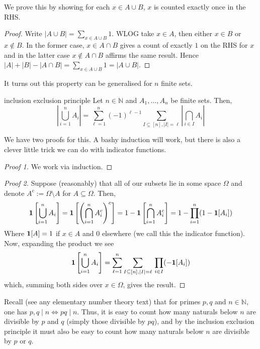 \documentclass{article}
\begin{document}
We prove this by showing for each $x \in A \cup B$, $x$ is counted exactly once in the RHS. 

\begin{proof}
    Write $|A \cup B| = \sum_{x \in A \cup B}1$.  WLOG take $x \in A$, then either $x \in B$ or $x \not\in B$. In the former 
    case, $x \in A \cap B$ gives a count of exactly $1$ on the RHS for $x$ and in the latter case $x \not\in A \cap B$ 
    affirms the same result. Hence $|A| + |B| - |A \cap B| = \sum_{x \in A \cup B}1 = |A \cup B|$. 
\end{proof}

It turns out this property can be generalised for $n$ finite sets.

\begin{theorem}[]{inclusion exclusion principle}
    Let $n \in \mathbb{N}$ and $A_1, \dots, A_n$ be finite sets. Then, 
    \[\left|\bigcup_{i=1}^n A_i\right| = \sum_{\ell = 1}^n (-1)^{\ell-1}\sum_{I \subseteq [n], |I| = \ell} \left|\bigcap_{i \in I}A_i\right|\]
\end{theorem}

We have two proofs for this. A bashy induction will work, but there is also a clever little trick we can do with indicator functions. 

\begin{proof}[Proof 1]
    We work via induction. 
\end{proof}

\begin{proof}[Proof 2]
    Suppose (reasonably) that all of our subsets lie in some space $\Omega$ and denote $A^c := \Omega \setminus A$ for 
    $A \subseteq \Omega$. Then, 
    \[{\bf 1}\left[\bigcup_{i=1}^n A_i\right] = {\bf 1}\left[\left(\bigcap_{i=1}^n A_i^c\right)^c\right]
    = 1 - {\bf 1}\left[\bigcap_{i=1}^n A_i^c\right] = 1 - \prod_{i=1}^n (1 - {\bf 1}[A_i])\]
    Where ${\bf 1}[A] = 1$ if $x \in A$ and $0$ elsewhere (we call this the indicator function). Now, expanding the 
    product we see 
    \[{\bf 1}\left[\bigcup_{i=1}^n A_i\right] 
    = \sum_{\ell = 1}^n \sum_{I \subseteq [n], \\ |I| = \ell} \, \prod_{i \in I} (- {\bf 1}[A_i])\] 
    which, summing both sides over $x \in \Omega$, gives the result.
\end{proof}

Recall (see any elementary number theory text) that for primes $p, q$ and $n \in \mathbb{N}$, one has 
$p, q \mid n \Leftrightarrow pq \mid n$. Thus, it is easy to count how many naturals below $n$ are divisible by $p$ and $q$ 
(simply those divisible by $pq$), and by the inclusion exclusion principle it must also be easy to count how many 
naturals below $n$ are divisible by $p$ or $q$. \\
\end{document}
